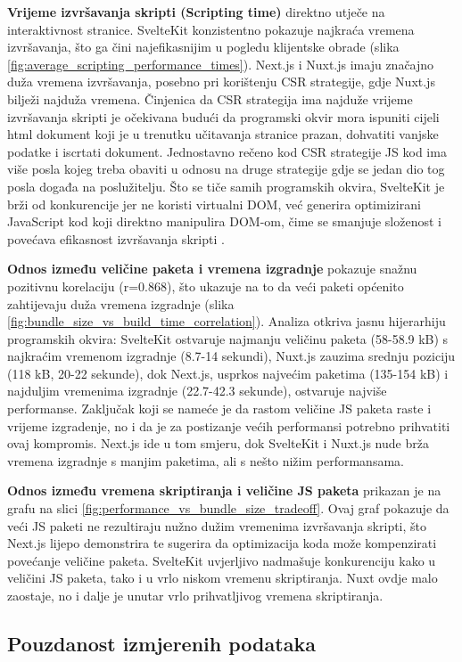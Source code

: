 \textbf{Vrijeme izvršavanja skripti (Scripting time)} direktno utječe na interaktivnost stranice. SvelteKit konzistentno pokazuje najkraća vremena izvršavanja, što ga čini najefikasnijim u pogledu klijentske obrade (slika \ref{fig:average_scripting_performance_times}). Next.js i Nuxt.js imaju značajno duža vremena izvršavanja, posebno pri korištenju CSR strategije, gdje Nuxt.js bilježi najduža vremena. Činjenica da CSR strategija ima najduže vrijeme izvršavanja skripti je očekivana budući da programski okvir mora ispuniti cijeli html dokument koji je u trenutku učitavanja stranice prazan, dohvatiti vanjske podatke i iscrtati dokument. Jednostavno rečeno kod CSR strategije JS kod ima više posla kojeg treba obaviti u odnosu na druge strategije gdje se jedan dio tog posla događa na poslužitelju. Što se tiče samih programskih okvira, SvelteKit je brži od konkurencije jer ne koristi virtualni DOM, već generira optimizirani JavaScript kod koji direktno manipulira DOM-om, čime se smanjuje složenost i povećava efikasnost izvršavanja skripti \cite{svelte2019reactivity}.


\textbf{Odnos između veličine paketa i vremena izgradnje} pokazuje snažnu pozitivnu korelaciju (r=0.868), što ukazuje na to da veći paketi općenito zahtijevaju duža vremena izgradnje (slika \ref{fig:bundle_size_vs_build_time_correlation}). Analiza otkriva jasnu hijerarhiju programskih okvira: SvelteKit ostvaruje najmanju veličinu paketa (58-58.9 kB) s najkraćim vremenom izgradnje (8.7-14 sekundi), Nuxt.js zauzima srednju poziciju (118 kB, 20-22 sekunde), dok Next.js, usprkos najvećim paketima (135-154 kB) i najduljim vremenima izgradnje (22.7-42.3 sekunde), ostvaruje najviše performanse.
Zaključak koji se nameće je da rastom veličine JS paketa raste i vrijeme izgradenje, no i da je za postizanje većih performansi potrebno prihvatiti ovaj kompromis. Next.js ide u tom smjeru, dok SvelteKit i Nuxt.js nude brža vremena izgradnje s manjim paketima, ali s nešto nižim performansama.

\textbf{Odnos između vremena skriptiranja i veličine JS paketa} prikazan je na grafu na slici \ref{fig:performance_vs_bundle_size_tradeoff}. Ovaj graf pokazuje da veći JS paketi ne rezultiraju nužno dužim vremenima izvršavanja skripti, što Next.js lijepo demonstrira te sugerira da optimizacija koda može kompenzirati povećanje veličine paketa. SvelteKit uvjerljivo nadmašuje konkurenciju kako u veličini JS paketa, tako i u vrlo niskom vremenu skriptiranja. Nuxt ovdje malo zaostaje, no i dalje je unutar vrlo prihvatljivog vremena skriptiranja.
\subsection{Pouzdanost izmjerenih podataka}


